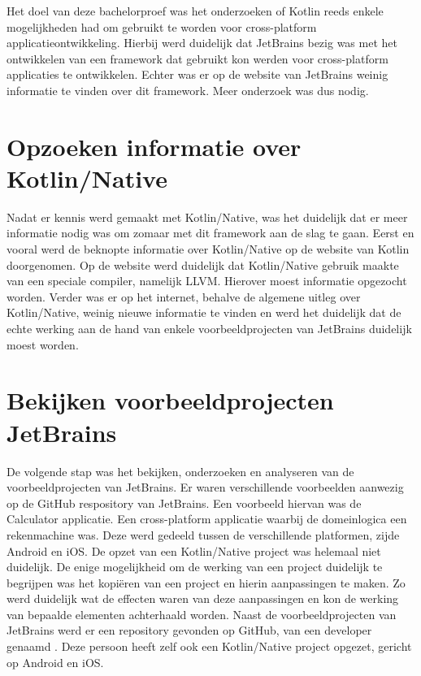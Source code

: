 Het doel van deze bachelorproef was het onderzoeken of Kotlin reeds enkele mogelijkheden had om gebruikt te worden voor cross-platform applicatieontwikkeling. Hierbij werd duidelijk dat JetBrains bezig was met het ontwikkelen van een framework dat gebruikt kon werden voor cross-platform applicaties te ontwikkelen. Echter was er op de website van JetBrains weinig informatie te vinden over dit framework. Meer onderzoek was dus nodig.

\section{Opzoeken informatie over Kotlin/Native}
\label{sec:infokn}
Nadat er kennis werd gemaakt met Kotlin/Native, was het duidelijk dat er meer informatie nodig was om zomaar met dit framework aan de slag te gaan. Eerst en vooral werd de beknopte informatie over Kotlin/Native op de website van Kotlin doorgenomen. Op de website werd duidelijk dat Kotlin/Native gebruik maakte van een speciale compiler, namelijk LLVM. Hierover moest informatie opgezocht worden. Verder was er op het internet, behalve de algemene uitleg over Kotlin/Native, weinig nieuwe informatie te vinden en werd het duidelijk dat de echte werking aan de hand van enkele voorbeeldprojecten van JetBrains duidelijk moest worden.

\section{Bekijken voorbeeldprojecten JetBrains}
De volgende stap was het bekijken, onderzoeken en analyseren van de voorbeeldprojecten van JetBrains. Er waren verschillende voorbeelden aanwezig op de GitHub respository van JetBrains. Een voorbeeld hiervan was de Calculator applicatie. Een cross-platform applicatie waarbij de domeinlogica een rekenmachine was. Deze werd gedeeld tussen de verschillende platformen, zijde Android en iOS. De opzet van een Kotlin/Native project was helemaal niet duidelijk. De enige mogelijkheid om de werking van een project duidelijk te begrijpen was het kopiëren van een project en hierin aanpassingen te maken. Zo werd duidelijk wat de effecten waren van deze aanpassingen en kon de werking van bepaalde elementen achterhaald worden. Naast de voorbeeldprojecten van JetBrains werd er een repository gevonden op GitHub, van een developer genaamd \textcite{AlbertGao}. Deze persoon heeft zelf ook een Kotlin/Native project opgezet, gericht op Android en iOS.

